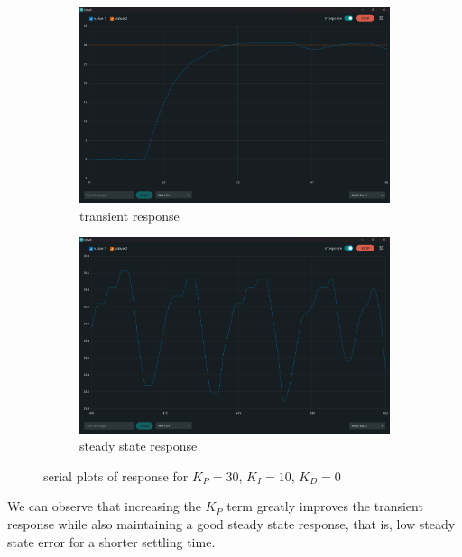 \documentclass[12pt]{article}
\begin{document}
\begin{figure}[h]
    \centering
    \begin{subfigure}{.44\textwidth}
        \centering
        \includegraphics[width=0.95\linewidth]{images/q1/Transient_30_10_0.png}
		\caption{transient response}
    \end{subfigure}
    \begin{subfigure}{.44\textwidth}
        \centering
        \includegraphics[width=0.95\linewidth]{images/q1/SS_30_10_0.png} 
		\caption{steady state response}
    \end{subfigure}\vspace{-1mm}
    \caption{serial plots of response for $K_P=30$, $K_I=10$, $K_D=0$}
\end{figure}

We can observe that increasing the $K_P$ term greatly improves the transient response while also maintaining a good steady state response, that is, low steady state error for a shorter settling time.

\pagebreak
\end{document}

